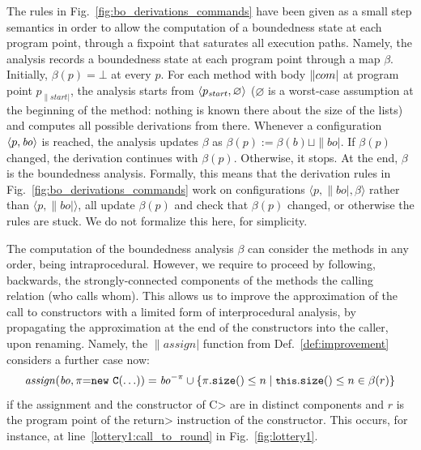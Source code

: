 The rules in Fig.~\ref{fig:bo_derivations_commands} have been given
as a small step semantics in order to allow the computation of a
boundedness state at each program point, through a
fixpoint that saturates all execution paths. Namely, the analysis records a boundedness
state at each program point through a map $\beta$. Initially,
$\beta(p)=\bot$ at every $p$.
For each method with body $\com$ at program point $p_{\|start|}$, the analysis starts from $\pair{p_{\|start|}}{\varnothing}$
($\varnothing$ is a worst-case assumption at the beginning
of the method: nothing is known there about the size of the lists)
and computes all possible derivations from there.
Whenever a configuration $\pair{p}{\|bo|}$ is reached, the analysis updates
$\beta$ as $\beta(p):=\beta(b)\sqcup\|bo|$.
If $\beta(p)$ changed, the derivation continues
with $\beta(p)$. Otherwise, it stops. At the end,
$\beta$ is the boundedness analysis.
Formally, this means that the derivation rules in Fig.~\ref{fig:bo_derivations_commands}
work on configurations $\langle p,\|bo|,\beta\rangle$ rather than $\langle p,\|bo|\rangle$,
all update $\beta(p)$ and check that $\beta(p)$ changed, or otherwise
the rules are stuck. We do not formalize this here, for simplicity.

The computation of the boundedness analysis $\beta$ can consider the methods in any order,
being intraprocedural. However, we require to proceed by following, backwards, the strongly-connected
components of the methods \wrt the calling relation (who calls whom). This allows us to improve
the approximation of the call to constructors with
a limited form of interprocedural analysis, by
propagating the approximation at the end of the constructors into the caller, upon renaming. Namely, the
$\|assign|$ function from Def.~\ref{def:improvement} considers a further case now:
%
\[
\|assign|(\|bo|,\assign{\pi}{\new{\mathtt{C}}{\ldots}})=\|bo|^{-\pi}\cup\{\size{\pi}\le n\mid\size{\<this>}\le n\in\beta(r)\}
\]
if the assignment and the constructor of \<C> are in distinct components and $r$ is the program
point of the \<return> instruction of the constructor. This occurs, for instance, at
line~\ref{lottery1:call_to_round} in Fig.~\ref{fig:lottery1}.

